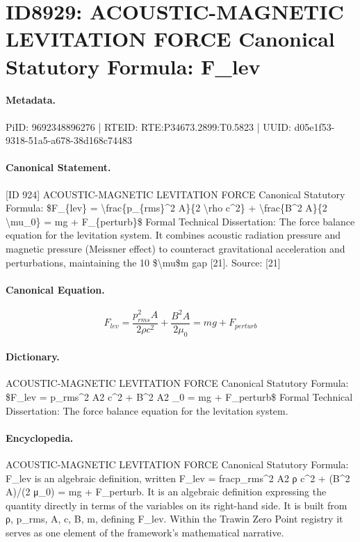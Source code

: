 \section*{ID8929: ACOUSTIC-MAGNETIC LEVITATION FORCE Canonical Statutory Formula: F\_lev}
\paragraph{Metadata.}
PiID: 9692348896276 | RTEID: RTE:P34673.2899:T0.5823 | UUID: d05e1f53-9318-51a5-a678-38d168c74483

\paragraph{Canonical Statement.}
[ID 924] ACOUSTIC-MAGNETIC LEVITATION FORCE Canonical Statutory Formula: \$F\_\{lev\} = \textbackslash{}frac\{p\_\{rms\}\textasciicircum{}2 A\}\{2 \textbackslash{}rho c\textasciicircum{}2\} + \textbackslash{}frac\{B\textasciicircum{}2 A\}\{2 \textbackslash{}mu\_0\} = mg + F\_\{perturb\}\$ Formal Technical Dissertation: The force balance equation for the levitation system. It combines acoustic radiation pressure and magnetic pressure (Meissner effect) to counteract gravitational acceleration and perturbations, maintaining the 10 \$\textbackslash{}mu\$m gap [21]. Source: [21]

\paragraph{Canonical Equation.}
\[
F_{lev} = \frac{p_{rms}^2 A}{2 \rho c^2} + \frac{B^2 A}{2 \mu_0} = mg + F_{perturb}
\]

\paragraph{Dictionary.}
ACOUSTIC-MAGNETIC LEVITATION FORCE Canonical Statutory Formula: \$F\_lev = p\_rms\textasciicircum{}2 A2 c\textasciicircum{}2 + B\textasciicircum{}2 A2 \_0 = mg + F\_perturb\$ Formal Technical Dissertation: The force balance equation for the levitation system.

\paragraph{Encyclopedia.}
ACOUSTIC-MAGNETIC LEVITATION FORCE Canonical Statutory Formula: F\_lev is an algebraic definition, written F\_lev = fracp\_rms\textasciicircum{}2 A2 ρ c\textasciicircum{}2 + (B\textasciicircum{}2 A)/(2 μ\_0) = mg + F\_perturb. It is an algebraic definition expressing the quantity directly in terms of the variables on its right-hand side. It is built from ρ, p\_rms, A, c, B, m, defining F\_lev. Within the Trawin Zero Point registry it serves as one element of the framework's mathematical narrative.
